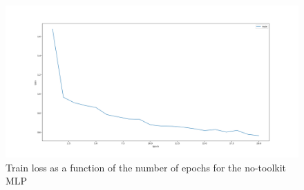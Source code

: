 \documentclass[12pt]{article}
\begin{document}
\begin{itemize}
        \begin{figure}[H]
            \centering
            \includegraphics[width=1\linewidth]{../outputs/hw1-q1-2b.001-loss.png}
            \caption{Train loss as a function of the number of epochs for the no-toolkit MLP}
            \label{fig:1.2b:loss}
        \end{figure}
\end{itemize}
\end{document}
